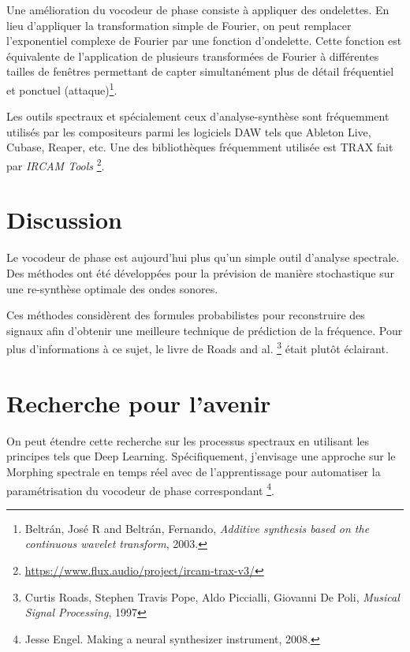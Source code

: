 Une amélioration du vocodeur de phase consiste à appliquer des ondelettes. En lieu d'appliquer la transformation simple de Fourier, on peut remplacer l'exponentiel complexe de Fourier par une fonction d'ondelette. Cette fonction est équivalente de l'application de plusieurs transformées de Fourier à différentes tailles de fenêtres permettant de capter simultanément plus de détail fréquentiel et ponctuel (attaque)\footnote{{Beltr{\'a}n, Jos{\'e} R and Beltr{\'a}n, Fernando}, \textit{Additive synthesis based on the continuous wavelet transform}, 2003.\nocite{beltran2003additive}}. 

Les outils spectraux et spécialement ceux d'analyse-synthèse sont fréquemment utilisés par les compositeurs parmi les logiciels DAW tels que Ableton Live, Cubase, Reaper, etc. Une des  bibliothèques fréquemment utilisée est TRAX fait par \textit{IRCAM Tools} \footnote{\href{https://www.flux.audio/project/ircam-trax-v3/}{https://www.flux.audio/project/ircam-trax-v3/}}.

\section{Discussion}

Le vocodeur de phase est aujourd'hui plus qu'un simple outil d'analyse spectrale. Des méthodes ont été développées pour la prévision de manière stochastique sur une re-synthèse optimale des ondes sonores.

Ces méthodes considèrent des formules probabilistes pour reconstruire des signaux afin d’obtenir une meilleure technique de prédiction de la fréquence. Pour plus d'informations à ce sujet, le livre de Roads and al. \footnote{Curtis Roads, Stephen Travis Pope, Aldo Piccialli, Giovanni De Poli, \textit{Musical Signal Processing}, 1997 \nocite{Roads97}} était plutôt éclairant.

\section{Recherche pour l'avenir}

On peut étendre cette recherche sur les processus spectraux en utilisant les principes tels que Deep Learning. Spécifiquement, j'envisage une approche sur le Morphing spectrale en temps réel avec de l'apprentissage pour automatiser la paramétrisation du vocodeur de phase correspondant \footnote{Jesse Engel. Making a neural synthesizer instrument, 2008.}. 

